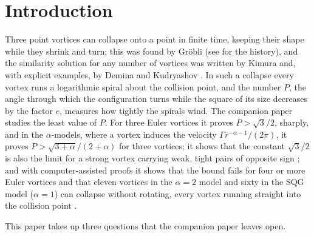 \documentclass[11pt]{article}
\theoremstyle{definition}
\begin{document}
\begin{abstract}
\medskip
\noindent\textbf{Keywords:} point vortices; vortex collapse; self-similar motion; relative equilibria; surface quasi-geostrophic equation; vortex sheet.\\
\textbf{MSC 2020:} 76B47, 37N10, 76U60.
\end{abstract}

\section{Introduction}

Three point vortices can collapse onto a point in finite time, keeping their shape while they shrink and turn; this was found by Gr\"obli (see \cite[p.~17, Fig.~3]{art1992} for the history), and the similarity solution for any number of vortices was written by Kimura \cite[Sect.~3.1]{kimura1987} and, with explicit examples, by Demina and Kudryashov \cite{dk2014}. In such a collapse every vortex runs a logarithmic spiral about the collision point, and the number $P$, the angle through which the configuration turns while the square of its size decreases by the factor $e$, measures how tightly the spirals wind. The companion paper \cite{mw2026} studies the least value of $P$. For three Euler vortices it proves $P > \sqrt{3}/2$, sharply, and in the $\alpha$-models, where a vortex induces the velocity $\Gamma r^{-\alpha-1}/(2\pi)$, it proves $P > \sqrt{3 + \alpha}/(2 + \alpha)$ for three vortices; it shows that the constant $\sqrt{3}/2$ is also the limit for a strong vortex carrying weak, tight pairs of opposite sign \cite[Theorem~3]{mw2026}; and with computer-assisted proofs it shows that the bound fails for four or more Euler vortices and that eleven vortices in the $\alpha = 2$ model and sixty in the SQG model ($\alpha = 1$) can collapse without rotating, every vortex running straight into the collision point \cite[Theorems~4, 5]{mw2026}.

This paper takes up three questions that the companion paper leaves open.
\end{document}
